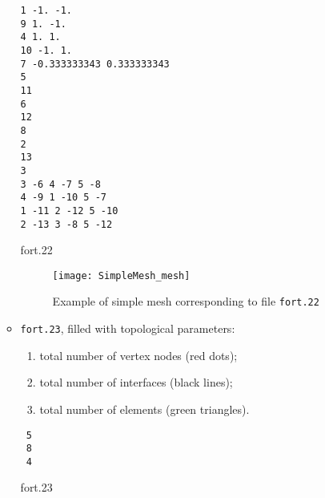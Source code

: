 \begin{itemize}
\begin{itemize}
\begin{exfile}[htpb]
\begin{footnotesize}
\texttt{1 -1. -1.\\
 9  1. -1.\\
 4  1.  1.\\
 10 -1.  1.\\
 7 -0.333333343  0.333333343\\
 5\\
 11\\
 6\\
 12\\
 8\\
 2\\
 13\\
 3\\
 3 -6 4 -7 5 -8\\
 4 -9 1 -10 5 -7\\
 1 -11 2 -12 5 -10\\
 2 -13 3 -8 5 -12\\
} 
\end{footnotesize}
\caption{fort.22\label{fig:fort22}}
\end{exfile}


\begin{figure}[H]
\centering
\texttt{[image: SimpleMesh\_mesh]}
\caption[Example of simple mesh]{Example of simple mesh corresponding to file \texttt{fort.22}}
\end{figure}




\item \texttt{fort.23}, filled with topological parameters: 
\begin{enumerate}
\item total number of vertex nodes (red dots);
\item total number of interfaces (black lines);  
\item total number of elements (green triangles).
\end{enumerate}

\begin{exfile}[H]
\begin{verbatim}
 5
 8
 4
 \end{verbatim}
\caption{fort.23\label{fig:fort23}}
\end{exfile}
 
\end{itemize}

\end{itemize}

